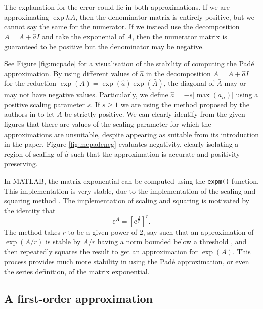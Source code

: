 The explanation for the error could lie in both approximations. If we are approximating $\exp{hA}$, then the denominator matrix is entirely positive, but we cannot say the same for the numerator.
If we instead use the decomposition $A = \bar{A} + \hat{a}I$ and take the exponenial of $\bar{A}$, then the numerator matrix is guaranteed to be positive but the denominator may be negative.

See Figure \ref{fig:mcpade} for a visualisation of the stability of computing the Pad\'e approximation.
By using different values of $\hat{a}$ in the decomposition $A = \bar{A} + \hat{a}I$ for the reduction $\exp(A) = \exp(\hat{a})\exp(\bar{A})$,
the diagonal of $\bar{A}$ may or may not have negative values.
Particularly, we define $\hat{a}= -s |\max(a_{ii})|$ using a positive scaling parameter $s$.
If $s\ge 1$ we are using the method proposed by the authors in \cite{blanes_pos_2022} to let $\bar{A}$ be strictly positive. 
We can clearly identify from the given figures that there are values of the scaling parameter for which the approximations are unsuitable, despite appearing as suitable from its introduction in the paper.
Figure \ref{fig:mcpadeneg} evaluates negativity, clearly isolating a region of scaling of $\hat{a}$ such that the approximation is accurate and positivity preserving.

In MATLAB, the matrix exponential can be computed using the \texttt{expm()} function.
This implementation is very stable, due to the implementation of the scaling and squaring method \cite{higham2005scaling,moler2003dubious}.
The implementation of scaling and squaring is motivated by the identity that
\begin{equation*}
	\mathrm{e}^A = \left[ \mathrm{e}^\frac{A}{r} \right]^r.
\end{equation*}
The method takes $r$ to be a given power of $2$, say such that an approximation of $\exp(A/r)$ is stable by $A/r$ having a norm bounded below a threshold \cite{higham2008exponential}, and then repeatedly squares the result to get an approximation for $\exp(A)$.
This process provides much more stability in using the Pad\'e approximation, or even the series definition, of the matrix exponential.

\subsection{A first-order approximation}

